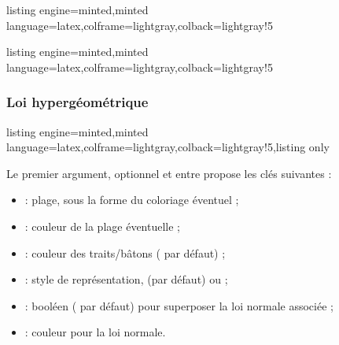 \documentclass[11pt,a4paper]{ltxdoc}
\begin{document}
\begin{tcblisting}{listing engine=minted,minted language=latex,colframe=lightgray,colback=lightgray!5}
\begin{GraphiqueTikz}[y=10cm,Xgrille=1,Ygrille=0.05,Xmin=0,Xmax=13,Ymin=0,Ymax=0.35]
\end{GraphiqueTikz}
\end{tcblisting}

\begin{tcblisting}{listing engine=minted,minted language=latex,colframe=lightgray,colback=lightgray!5}
\begin{GraphiqueTikz}[y=10cm,Xgrille=1,Ygrille=0.05,Xmin=0,Xmax=13,Ymin=0,Ymax=0.35]
\end{GraphiqueTikz}
\end{tcblisting}

\subsubsection{Loi hypergéométrique}\label{loihypergeo}

\begin{tcblisting}{listing engine=minted,minted language=latex,colframe=lightgray,colback=lightgray!5,listing only}
\end{tcblisting}

Le premier argument, optionnel et entre \MontreCode{[...]} propose les clés suivantes :

\begin{itemize}
  \item {} : plage, sous la forme  du coloriage éventuel ;
  \item {} : couleur de la plage éventuelle ;
  \item {} : couleur des traits/bâtons ( par défaut) ;
  \item {} : style de représentation,  (par défaut) ou  ;
  \item {} : booléen ( par défaut) pour superposer la loi normale associée ;
  \item {} : couleur pour la loi normale.
\end{itemize}
\end{document}

